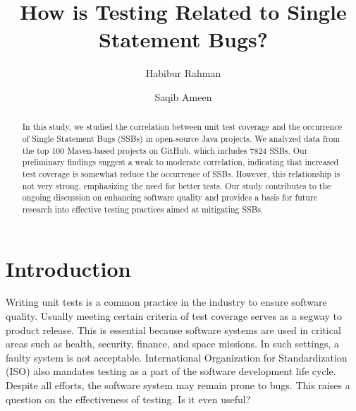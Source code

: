 \documentclass[sigconf,nonacm]{acmart}
\begin{document}
\title{How is Testing Related to Single Statement Bugs?}

\author{Habibur Rahman}

\author{Saqib Ameen}
\authornotemark[1]
\authornotemark[2]




\begin{abstract}
	In this study, we studied the correlation between unit test coverage and the occurrence of Single Statement Bugs (SSBs) in open-source Java projects. We analyzed data from the top 100 Maven-based projects on GitHub, which includes 7824 SSBs. Our preliminary findings suggest a weak to moderate correlation, indicating that increased test coverage is somewhat reduce the occurrence of SSBs. However, this relationship is not very strong, emphasizing the need for better tests. Our study contributes to the ongoing discussion on enhancing software quality and provides a basis for future research into effective testing practices aimed at mitigating SSBs.
	\end{abstract}	


\maketitle
{}
\section{Introduction}
Writing unit tests is a common practice in the industry to ensure software quality. Usually meeting certain criteria of test coverage serves as a segway to product release. This is essential because software systems are used in critical areas such as health, security, finance, and space missions. In such settings, a faulty system is not acceptable. International Organization for Standardization (ISO) also mandates testing as a part of the software development life cycle. Despite all efforts, the software system may remain prone to bugs. This raises a question on the effectiveness of testing. Is it even useful?
\end{document}
